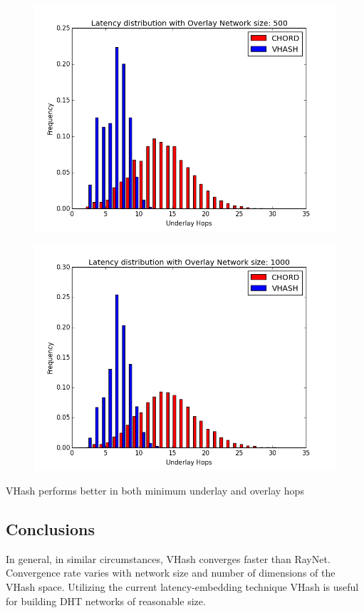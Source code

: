 \documentclass{IEEEtran}
\begin{document}
\begin{figure}
	\centering
	\includegraphics[width=\linewidth]{hist_500}
	\label{hist500}
\end{figure}

\begin{figure}
	\centering
	\includegraphics[width=\linewidth]{hist_1000}
	\label{hist1000}
\end{figure}


VHash performs better in both minimum underlay and overlay hops


\subsection{Conclusions}
In general, in similar circumstances, VHash converges faster than RayNet.
Convergence rate varies with network size and number of dimensions of the VHash space.
Utilizing the current latency-embedding technique VHash is useful for building DHT networks of reasonable size.
\end{document}
